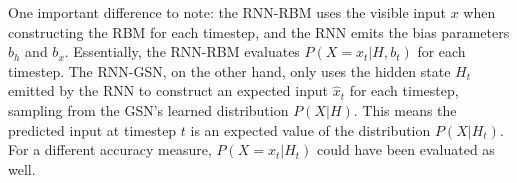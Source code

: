 One important difference to note: the RNN-RBM uses the visible input $x$ when constructing the RBM for each timestep, and the RNN emits the bias parameters $b_h$ and $b_x$. Essentially, the RNN-RBM evaluates $P(X=x_t|H,b_t)$ for each timestep.
The RNN-GSN, on the other hand, only uses the hidden state $H_t$ emitted by the RNN to construct an expected input $\hat{x}_t$ for each timestep, sampling from the GSN's learned distribution $P(X|H)$. This means the predicted input at timestep $t$ is an expected value of the distribution $P(X|H_t)$. For a different accuracy measure, $P(X=x_t|H_t)$ could have been evaluated as well.
